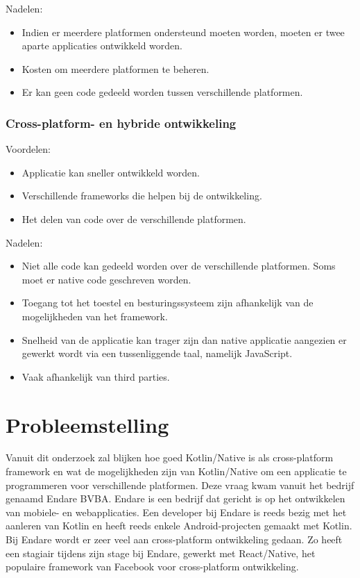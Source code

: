 Nadelen:
\begin{itemize}
	\item Indien er meerdere platformen ondersteund moeten worden, moeten er twee aparte applicaties ontwikkeld worden.
	\item Kosten om meerdere platformen te beheren.
	\item Er kan geen code gedeeld worden tussen verschillende platformen.
\end{itemize}

\subsubsection{Cross-platform- en hybride ontwikkeling}
Voordelen:
\begin{itemize}
	\item Applicatie kan sneller ontwikkeld worden.
	\item Verschillende frameworks die helpen bij de ontwikkeling.
	\item Het delen van code over de verschillende platformen.
\end{itemize}

Nadelen:
\begin{itemize}
	\item Niet alle code kan gedeeld worden over de verschillende platformen. Soms moet er native code geschreven worden.
	\item Toegang tot het toestel en besturingssysteem zijn afhankelijk van de mogelijkheden van het framework.
	\item Snelheid van de applicatie kan trager zijn dan native applicatie aangezien er gewerkt wordt via een tussenliggende taal, namelijk JavaScript.
	\item Vaak afhankelijk van third parties.
\end{itemize}

\section{Probleemstelling}
\label{sec:probleemstelling}
Vanuit dit onderzoek zal blijken hoe goed Kotlin/Native is als cross-platform framework en wat de mogelijkheden zijn van Kotlin/Native om een applicatie te programmeren voor verschillende platformen. Deze vraag kwam vanuit het bedrijf genaamd Endare BVBA. Endare is een bedrijf dat gericht is op het ontwikkelen van mobiele- en webapplicaties. Een developer bij Endare is reeds bezig met het aanleren van Kotlin en heeft reeds enkele Android-projecten gemaakt met Kotlin. Bij Endare wordt er zeer veel aan cross-platform ontwikkeling gedaan. Zo heeft een stagiair tijdens zijn stage bij Endare, gewerkt met React/Native, het populaire framework van Facebook voor cross-platform ontwikkeling.


